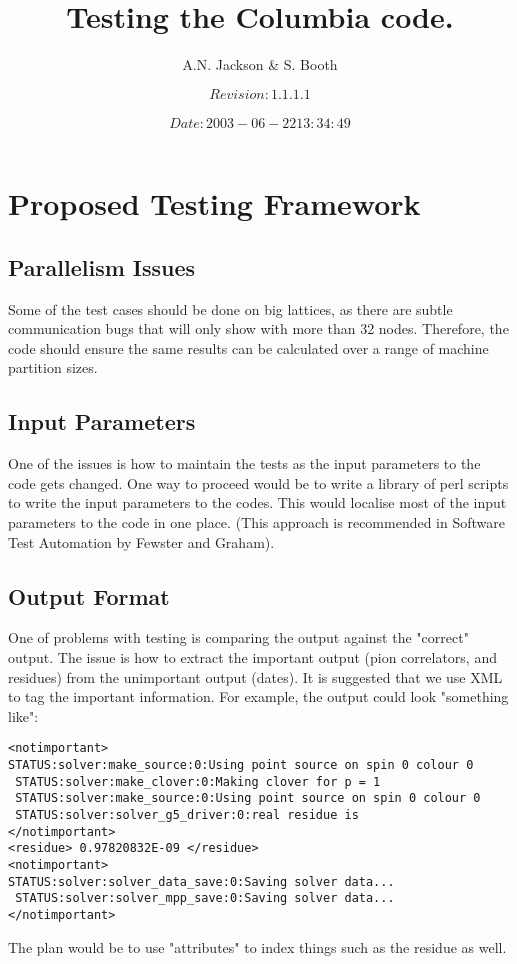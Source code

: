 \documentclass[12pt]{article}
\title{Testing the Columbia code.}
\author{A.N. Jackson \& S. Booth}
\date{\mbox{\small $$Revision: 1.1.1.1 $$  $$Date: 2003-06-22 13:34:49 $$}}
\begin{document}
\maketitle

\tableofcontents
\newpage

\section{Proposed Testing Framework}

\subsection{Parallelism Issues}
Some of the test cases should be done on big lattices, as there are subtle communication bugs that will only show with more than 32 nodes.  Therefore, the code should ensure the same results can be calculated over a range of machine partition sizes.

\subsection{Input Parameters}
One of the issues is how to maintain the tests 
as the input parameters to the code gets changed. One way to
proceed would be to write a library of perl scripts to write 
the input parameters to the codes. This would localise most of the 
input parameters to the code in one place. (This approach is 
recommended in Software Test Automation by Fewster and 
Graham).


\subsection{Output Format}
One of problems with testing is comparing the output against the "correct" output. The issue is how to extract the important output (pion correlators, and residues) from the unimportant output (dates).  It is suggested that we use XML to tag the important information. 
For example, the output could look "something like":
\begin{verbatim}
<notimportant>
STATUS:solver:make_source:0:Using point source on spin 0 colour 0
 STATUS:solver:make_clover:0:Making clover for p = 1
 STATUS:solver:make_source:0:Using point source on spin 0 colour 0
 STATUS:solver:solver_g5_driver:0:real residue is  
</notimportant>
<residue> 0.97820832E-09 </residue>
<notimportant>
STATUS:solver:solver_data_save:0:Saving solver data...
 STATUS:solver:solver_mpp_save:0:Saving solver data...
</notimportant>
\end{verbatim}
The plan would be to use "attributes" to index
things such as the residue as well.
\end{document}
